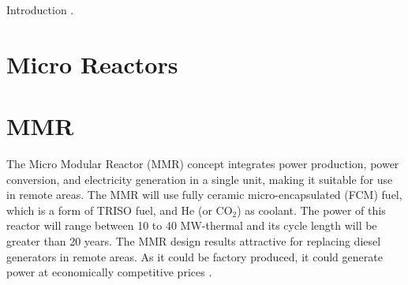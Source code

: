 Introduction \cite{huff_extensions_2014}.

\section{Micro Reactors}

\section{MMR}

The Micro Modular Reactor (MMR) concept integrates power production, power conversion, and electricity generation in a single unit, making it suitable for use in remote areas. 
The MMR will use fully ceramic micro-encapsulated (FCM) fuel, which is a form of TRISO fuel, and He (or CO$_2$) as coolant.
The power of this reactor will range between 10 to 40 MW-thermal and its cycle length will be greater than 20 years.
The MMR design results attractive for replacing diesel generators in remote areas. As it could be factory produced, it could generate power at economically competitive prices \cite{hawari_development_2018}.

